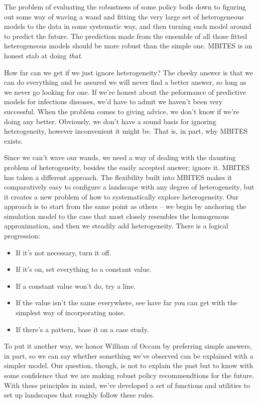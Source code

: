 \documentclass{article}
\begin{document}
The problem of evaluating the robustness of some policy boils down to figuring out some way of waving a wand and fitting the very large set of heterogeneous models to the data in some systematic way, and then turning each model around to predict the future. The prediction made from the ensemble of all those fitted heterogeneous models should be more robust than the simple one. MBITES is an honest stab at doing {\em that}. 

How far can we get if we just ignore heterogeneity? The cheeky answer is that we can do everything and be assured we will never find a better answer, so long as we never go looking for one. If we're honest about the peformance of predictive models for infectious diseases, we'd have to admit we haven't been very successful. When the problem comes to giving advice, we don't know if we're doing any better.  Obviously, we don't have a sound basis for ignoring heterogeneity, however inconvenient it might be. That is, in part, why MBITES exists. 

Since we can't wave our wands, we need a way of dealing with the daunting problem of heterogeneity, besides the easily accepted answer; ignore it. MBITES has taken a different approach. The flexibility built into MBITES makes it comparatively easy to configure a landscape with any degree of heterogeneity, but it creates a new problem of how to systematically explore heterogeneity.  Our approach is to start from the same point as others -- we begin by anchoring the simulation model to the case that most closely resembles the homogenous approximation, and then we steadily add heterogeneity. There is a logical progression: 
\begin{itemize}
\item If it's not necessary, turn it off. 
\item If it's on, set everything to a constant value. 
\item If a constant value won't do, try a line. 
\item If the value isn't the same everywhere, see have far you can get with the simplest way of incorporating noise.
\item If there's a pattern, base it on a case study.  
\end{itemize}
To put it another way, we honor William of Occam by preferring simple answers, in part, so we can say whether something we've observed can be explained with a simpler model. Our question, though, is not to explain the past but to know with some confidence that we are making robust policy recommendtions for the future. With these principles in mind, we've developed a set of functions and utilities to set up landscapes that roughly follow these rules. 
\end{document}
